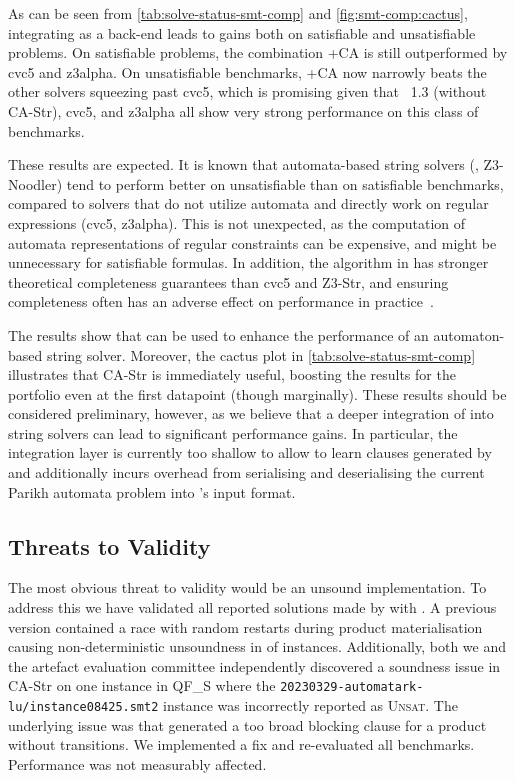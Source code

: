 As can be seen from \cref{tab:solve-status-smt-comp} and \cref{fig:smt-comp:cactus},
integrating \Catra{} as a back-end
leads to gains both on satisfiable and unsatisfiable problems. On
satisfiable problems, the combination \Ostrich+CA is still
outperformed by cvc5 and z3alpha. On unsatisfiable benchmarks,
\Ostrich+CA now narrowly beats the other solvers squeezing past cvc5,
which is promising given that \Ostrich{}~1.3 (without CA-Str), cvc5, and z3alpha all show very strong
performance on this class of benchmarks.

These results are expected. It is known that automata-based string solvers (\Ostrich{}, Z3-Noodler) 
tend to perform better on unsatisfiable than on satisfiable benchmarks, compared to solvers
that do not utilize automata and directly work on regular expressions (cvc5, z3alpha).
This is not unexpected, as the computation of automata representations of regular 
constraints can be expensive, and might be unnecessary for satisfiable formulas.
In addition, the algorithm in \Ostrich{} has stronger theoretical completeness
guarantees than cvc5 and Z3-Str, and ensuring completeness often has an adverse
effect on performance in practice~\cite{ostrich,Z3-str,cvc5}.

The results show that \Calculus{} can be used to enhance the performance of an
automaton-based string solver. Moreover, the cactus plot in \cref{tab:solve-status-smt-comp} 
illustrates that
CA-Str is immediately useful, boosting the results for the \Ostrich{} portfolio
even at the first datapoint (though marginally). These results should be considered preliminary,
however, as we believe that a deeper integration of \Catra{} into string solvers
can lead to significant performance gains. In particular, the integration layer 
is currently too shallow to allow \Ostrich{} to learn clauses generated by \Catra{}
and additionally incurs overhead from serialising and deserialising the current Parikh
automata problem into \Catra{}'s input format.

\subsection{Threats to Validity}

The most obvious threat to validity would be an unsound implementation. To
address this we have validated all reported solutions made by \Calculus{} with
\Nuxmv{}. A previous version contained a race with random restarts during
product materialisation causing non-deterministic unsoundness in 
of instances. Additionally, both we and the artefact evaluation committee independently
discovered a soundness issue in CA-Str on one instance in QF\_S where the 
\texttt{20230329-automatark-lu\slash{}instance08425.smt2} instance was
incorrectly reported as \textsc{Unsat}. The underlying issue was that \Catra{} generated
a too broad blocking clause for a product without transitions. We implemented a fix
and re-evaluated all benchmarks. Performance was not measurably affected.

